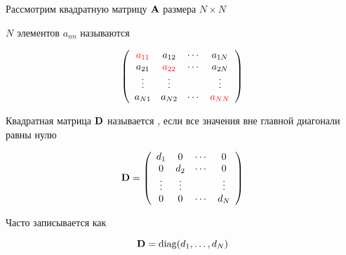 \begin{frame}

    \vspace{2em}
    Рассмотрим квадратную матрицу $\mathbf A$ размера $N \times N$ 

    \vspace{1em}

    $N$ элементов $a_{nn}$ называются 

    \vspace{1em}
    \begin{equation*}
        \left(
        \begin{array}{cccc}
            \textcolor{red}{a_{11}} & a_{12} & \cdots & a_{1N} \\
            a_{21} & \textcolor{red}{a_{22}} & \cdots & a_{2N} \\
            \vdots & \vdots &  & \vdots \\
            a_{N1} & a_{N2} & \cdots & \textcolor{red}{a_{NN}} \\
        \end{array}
        \right)
    \end{equation*}

\end{frame}


\begin{frame}
    
    \vspace{2em}
    Квадратная матрица $\mathbf D$ называется , если все значения вне
    главной диагонали равны нулю

    \begin{equation*}
        \mathbf D = 
        \left(
        \begin{array}{cccc}
            d_1 & 0 & \cdots & 0 \\
            0 & d_2 & \cdots & 0 \\
            \vdots & \vdots &  & \vdots \\
            0 & 0 & \cdots & d_N \\
        \end{array}
        \right)
    \end{equation*}

    \vspace{1em}

    Часто записывается как
    
    \begin{equation*}
        \mathbf D = \operatorname{diag}(d_1, \ldots, d_N) 
    \end{equation*}

\end{frame}



